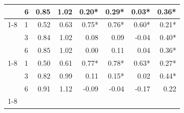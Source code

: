 \begin{table}
\begin{tabular}{llrrrrrr}
 & 6 & 0.85 & 1.02 & 0.20* & 0.29* & 0.03* & 0.36* \\
\cline{1-8}
\multirow[t]{3}{*}{rf} & 1 & 0.52 & 0.63 & 0.75* & 0.76* & 0.60* & 0.21* \\
 & 3 & 0.84 & 1.02 & 0.08 & 0.09 & -0.04 & 0.40* \\
 & 6 & 0.85 & 1.02 & 0.00 & 0.11 & 0.04 & 0.36* \\
\cline{1-8}
\multirow[t]{3}{*}{xgboost} & 1 & 0.50 & 0.61 & 0.77* & 0.78* & 0.63* & 0.27* \\
 & 3 & 0.82 & 0.99 & 0.11 & 0.15* & 0.02 & 0.44* \\
 & 6 & 0.91 & 1.12 & -0.09 & -0.04 & -0.17 & 0.22 \\
\cline{1-8}
\bottomrule
\end{tabular}
\end{table}
